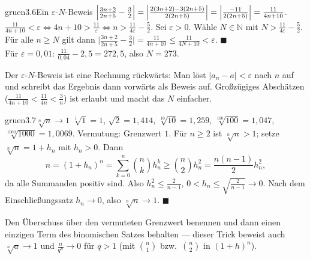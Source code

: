 \begin{loesungkarte}{gruen}{3.6}{Ein $\varepsilon$-$N$-Beweis}
$\Bigl|\frac{3n + 2}{2n + 5} - \frac32\Bigr| = \Bigl|\frac{2(3n + 2) - 3(2n + 5)}{2(2n + 5)}\Bigr| = \Bigl|\frac{-11}{2(2n + 5)}\Bigr| = \frac{11}{4n + 10}$.
$\frac{11}{4n + 10} < \varepsilon\iff4n + 10 > \frac{11}\varepsilon\iff n > \frac{11}{4\varepsilon} - \frac52$.
Sei $\varepsilon > 0$. Wähle $N\in\mathbb N$ mit $N > \frac{11}{4\varepsilon} - \frac52$. Für alle $n\ge N$ gilt dann $\bigl|\frac{3n + 2}{2n + 5} - \frac32\bigr| = \frac{11}{4n + 10}\le\frac{11}{4N + 10} < \varepsilon$. $\blacksquare$ \\
Für $\varepsilon = 0{,}01$: $\frac{11}{0{,}04} - 2{,}5 = 272{,}5$, also $N = 273$.
\begin{mitnehmen}\kastentext
Der $\varepsilon$-$N$-Beweis ist eine Rechnung rückwärts: Man löst $|a_n - a| < \varepsilon$ nach $n$ auf und schreibt das Ergebnis dann vorwärts als Beweis auf. Großzügiges Abschätzen ($\frac{11}{4n + 10} < \frac{11}{4n} < \frac3n$) ist erlaubt und macht das $N$ einfacher.
\end{mitnehmen}
\end{loesungkarte}

\begin{loesungkarte}{gruen}{3.7}{$\sqrt[n]{n}\to1$}
$\sqrt[1]1 = 1$, $\sqrt2 = 1{,}414$, $\sqrt[10]{10} = 1{,}259$, $\sqrt[100]{100} = 1{,}047$, $\sqrt[1000]{1000} = 1{,}0069$. Vermutung: Grenzwert $1$.
Für $n\ge2$ ist $\sqrt[n]n > 1$; setze $\sqrt[n]n = 1 + h_n$ mit $h_n > 0$. Dann
\[ n = (1 + h_n)^{n} = \sum_{k=0}^{n}\binom nkh_n^{k}\ge\binom n2h_n^{2} = \frac{n(n - 1)}2h_n^{2}, \]
da alle Summanden positiv sind. Also $h_n^{2}\le\frac2{n - 1}$, $0 < h_n\le\sqrt{\frac2{n - 1}}\to0$. Nach dem Einschließungssatz $h_n\to0$, also $\sqrt[n]n\to1$. $\blacksquare$
\begin{mitnehmen}\kastentext
Den Überschuss über den vermuteten Grenzwert benennen und dann einen einzigen Term des binomischen Satzes behalten --- dieser Trick beweist auch $\sqrt[n]a\to1$ und $\frac{n}{q^{n}}\to0$ für $q > 1$ (mit $\binom n1$ bzw.\ $\binom n2$ in $(1 + h)^{n}$).
\end{mitnehmen}
\end{loesungkarte}

